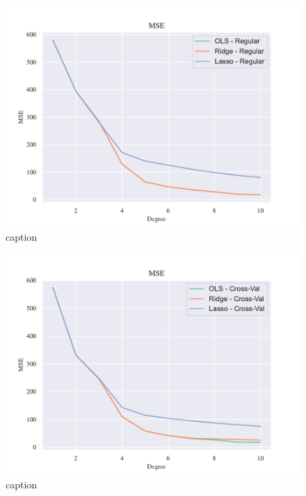 \begin{figure}[h!]
    \centering
    \includegraphics[width=1\linewidth]{project_1_alt/figures/figures_in_report/All_Terrain_OLS.pdf}
    \caption{caption}
    \label{bias_var_trade}
\end{figure}


\begin{figure}[h!]
    \centering
    \includegraphics[width=1\linewidth]{project_1_alt/figures/figures_in_report/All_Terrain_CV_k10.pdf}
    \caption{caption}
    \label{bias_var_trade}
\end{figure}

